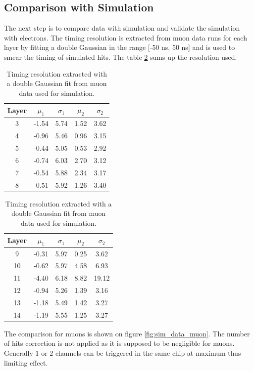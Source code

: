 \documentclass[twoside,a4paper,11pt]{article}
\begin{document}
\subsection{Comparison with Simulation}

The next step is to compare data with simulation and validate the simulation with electrons. The timing resolution is extracted from muon data runs for each layer by fitting a double Gaussian in the range [-50 ns, 50 ns] and is used to smear the timing of simulated hits. The table \ref{table:time_res_sim} sums up the resolution used.
\begin{table}[htbp]
\centering
  \begin{tabular}{@{} ccccc @{}}
    \hline
    Layer & $\mu_{1}$ & $\sigma_{1}$ & $\mu_{2}$ & $\sigma_{2}$ \\ 
    \hline
    3 & -1.54 & 5.74 & 1.52 & 3.62 \\
    4 & -0.96 & 5.46 & 0.96 & 3.15 \\
    5 & -0.44 & 5.05 & 0.53 & 2.92 \\
    6 & -0.74 & 6.03 & 2.70 & 3.12\footnotemark[1] \\
    7 & -0.54 & 5.88 & 2.34 & 3.17 \\
    8 & -0.51 & 5.92 & 1.26 & 3.40 \\
    \hline
  \end{tabular}
  \hspace{2ex}
  \begin{tabular}{@{} ccccc @{}}
    \hline
    Layer & $\mu_{1}$ & $\sigma_{1}$ & $\mu_{2}$ & $\sigma_{2}$ \\ 
    \hline
    9 & -0.31 & 5.97 & 0.25 & 3.62 \\
    10 & -0.62 & 5.97 & 4.58 & 6.93 \\
    11 & -4.40 & 6.18 & 8.82 & 19.12\footnotemark[1] \\
    12 & -0.94 & 5.26 & 1.39 & 3.16 \\
    13 & -1.18 & 5.49 & 1.42 & 3.27 \\
    14 & -1.19 & 5.55 & 1.25 & 3.27 \\
	\hline
  \end{tabular}
  \caption{Timing resolution extracted with a double Gaussian fit from muon data used for simulation.}
  \label{table:time_res_sim}
\end{table}
The comparison for muons is shown on figure \ref{fig:sim_data_muon}. The number of hits correction is not applied as it is supposed to be negligible for muons. Generally 1 or 2 channels can be triggered in the same chip at maximum thus limiting effect.
\end{document}
